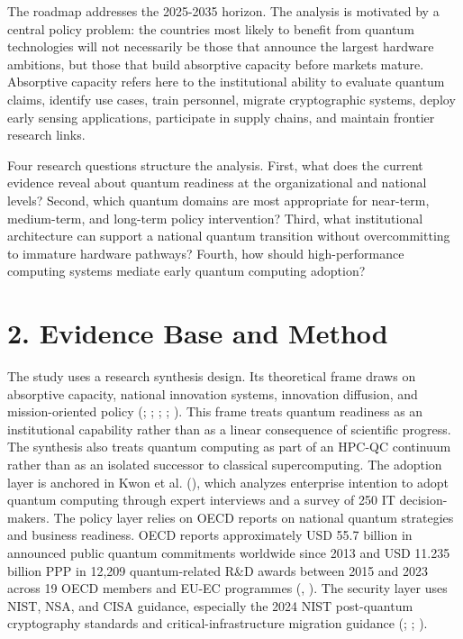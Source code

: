 \documentclass[
  11pt,
  letterpaper,
]{article}
\begin{document}
The roadmap addresses the 2025-2035 horizon. The analysis is motivated
by a central policy problem: the countries most likely to benefit from
quantum technologies will not necessarily be those that announce the
largest hardware ambitions, but those that build absorptive capacity
before markets mature. Absorptive capacity refers here to the
institutional ability to evaluate quantum claims, identify use cases,
train personnel, migrate cryptographic systems, deploy early sensing
applications, participate in supply chains, and maintain frontier
research links.

Four research questions structure the analysis. First, what does the
current evidence reveal about quantum readiness at the organizational
and national levels? Second, which quantum domains are most appropriate
for near-term, medium-term, and long-term policy intervention? Third,
what institutional architecture can support a national quantum
transition without overcommitting to immature hardware pathways? Fourth,
how should high-performance computing systems mediate early quantum
computing adoption?

\section{2. Evidence Base and Method}\label{evidence-base-and-method}

The study uses a research synthesis design. Its theoretical frame draws
on absorptive capacity, national innovation systems, innovation
diffusion, and mission-oriented policy (; ;
; ; ). This frame treats
quantum readiness as an institutional capability rather than as a linear
consequence of scientific progress. The synthesis also treats quantum
computing as part of an HPC-QC continuum rather than as an isolated
successor to classical supercomputing. The adoption layer is anchored in
Kwon et al. (), which analyzes enterprise
intention to adopt quantum computing through expert interviews and a
survey of 250 IT decision-makers. The policy layer relies on OECD
reports on national quantum strategies and business readiness. OECD
reports approximately USD 55.7 billion in announced public quantum
commitments worldwide since 2013 and USD 11.235 billion PPP in 12,209
quantum-related R\&D awards between 2015 and 2023 across 19 OECD members
and EU-EC programmes (,
). The security layer uses NIST, NSA, and
CISA guidance, especially the 2024 NIST post-quantum cryptography
standards and critical-infrastructure migration guidance
(;
; ).
\end{document}
